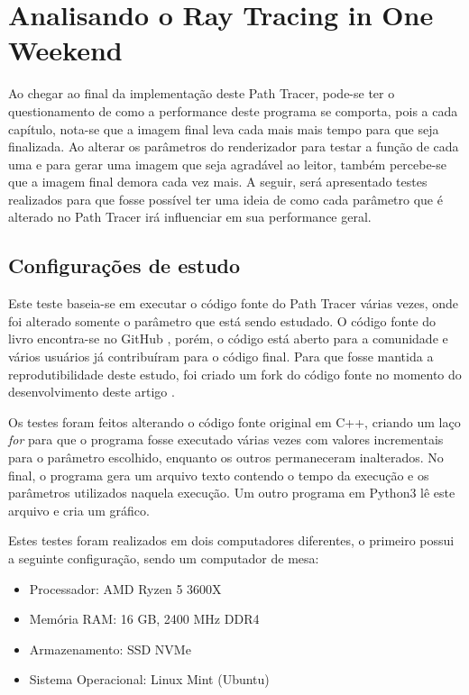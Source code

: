\documentclass[journal]{IEEEtran}
\begin{document}
\section{Analisando o Ray Tracing in One Weekend}
Ao chegar ao final da implementação deste Path Tracer, pode-se ter o questionamento de como a performance
deste programa se comporta, pois a cada capítulo, nota-se que a imagem final leva cada mais mais tempo para
que seja finalizada. Ao alterar os parâmetros do renderizador para testar a função de cada uma e para gerar
uma imagem que seja agradável ao leitor, também percebe-se que a imagem final demora cada vez mais. A seguir,
será apresentado testes realizados para que fosse possível ter uma ideia de como cada parâmetro que é alterado
no Path Tracer irá influenciar em sua performance geral.

\subsection{Configurações de estudo}
Este teste baseia-se em executar o código fonte do Path Tracer várias vezes, onde foi alterado somente o 
parâmetro que está sendo estudado. O código fonte do livro encontra-se no GitHub \cite{RayTracinOneWeekend-GitHub},
porém, o código está aberto para a comunidade e vários usuários já contribuíram para o código final. Para
que fosse mantida a reprodutibilidade deste estudo, foi criado um fork do código fonte no momento do
desenvolvimento deste artigo \cite{RayTracinOneWeekend-Artigo}.

Os testes foram feitos alterando o código fonte original em C++, criando um laço \emph{for} para que o programa
fosse executado várias vezes com valores incrementais para o parâmetro escolhido, enquanto os outros
permaneceram inalterados. No final, o programa gera um arquivo texto contendo o tempo da execução e os
parâmetros utilizados naquela execução. Um outro programa em Python3 lê este arquivo e cria um gráfico.

Estes testes foram realizados em dois computadores diferentes, o primeiro possui a seguinte configuração, sendo
um computador de mesa:

\begin{itemize}
  \item Processador: AMD Ryzen 5 3600X
  \item Memória RAM: 16 GB, 2400 MHz DDR4
  \item Armazenamento: SSD NVMe
  \item Sistema Operacional: Linux Mint (Ubuntu)
\end{itemize}
\end{document}
